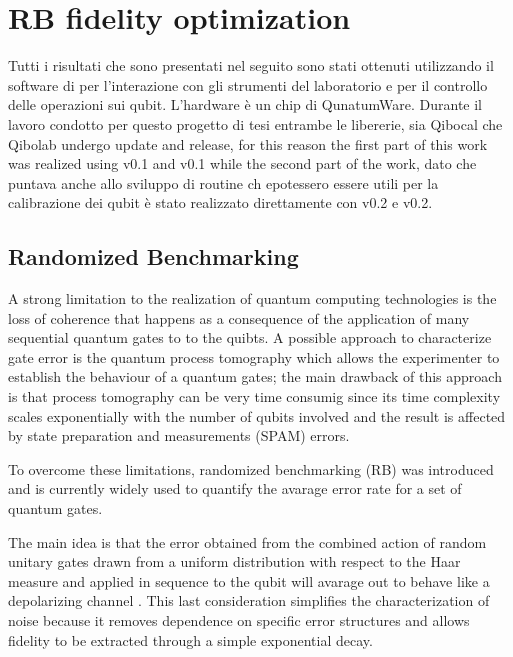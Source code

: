 \chapter{RB fidelity optimization}

Tutti i risultati che sono presentati nel seguito sono stati ottenuti utilizzando il software di \Qibolab per l'interazione con gli strumenti del laboratorio e \Qibocal per il controllo delle operazioni sui qubit.
L'hardware è un chip di QunatumWare. %
Durante il lavoro condotto per questo progetto di tesi entrambe le libererie, sia Qibocal che Qibolab undergo update and release, for this reason the first part of this work was realized using \Qibocal v0.1 and \Qibolab v0.1 while the second part of the work, 
dato che puntava anche allo sviluppo di routine ch epotessero essere utili per la calibrazione dei qubit è stato realizzato direttamente con \Qibocal v0.2 e \Qibolab v0.2. 


\section{Randomized Benchmarking}\label{RBsection}
A strong limitation to the realization of quantum computing technologies is the loss of coherence that happens as a consequence of the application of many sequential quantum gates to to the quibts.
A possible approach to characterize gate error is the quantum process tomography which allows the experimenter to establish the behaviour of a quantum gates; the main drawback of this approach is that process tomography can be very time consumig since its time complexity scales exponentially with the number of qubits involved \cite{QPTomography} and the result is affected by state preparation and measurements (SPAM) errors.

To overcome these limitations, randomized benchmarking (RB) was introduced and is currently widely used to quantify the avarage error rate for a set of quantum gates.

The main idea is that the error obtained from the combined action of random unitary gates drawn from a uniform distribution with respect to the Haar measure \cite{Mele_2024} and applied in sequence to the qubit will avarage out to behave like a depolarizing channel \cite{Emerson_2005_RB}.
This last consideration simplifies the characterization of noise because it removes dependence on specific error structures and allows fidelity to be extracted through a simple exponential decay.

